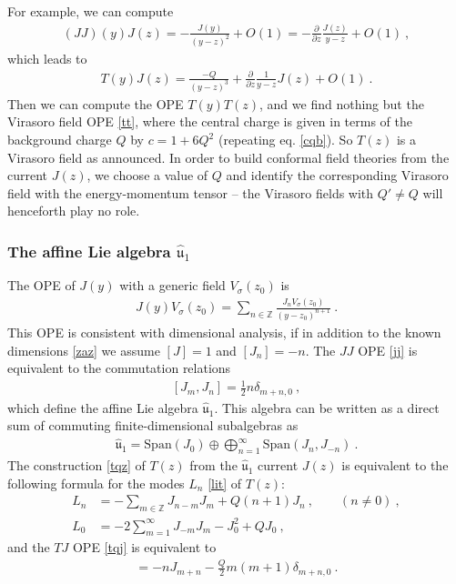 \documentclass[12pt, a4paper, notitlepage, twoside]{report}
\numberwithin{equation}{section}
\theoremstyle{break}
\begin{document}
For example, we can compute 
\begin{align}
 (JJ)(y)J(z) = -\frac{J(y)}{(y-z)^2} +O(1) =  -{\frac{\partial}{\partial z}}\frac{J(z)}{y-z} + O(1)\ ,
\end{align}
which leads to 
\begin{align}
 \boxed{T(y)J(z) = \frac{-Q}{(y-z)^3} +{\frac{\partial}{\partial z}}\frac{1}{y-z}J(z) + O(1)}\ .
\label{tqj}
\end{align}
Then we can compute the OPE $T(y)T(z)$, and we find nothing but the Virasoro field OPE \eqref{tt}, where the central charge is given in terms of the background charge $Q$ by $c = 1+6 Q^2$ (repeating eq. \eqref{cqb}). 
So $T(z)$ is a Virasoro field as announced. 
In order to build conformal field theories from the current $J(z)$, we choose a value of $Q$ and identify the corresponding Virasoro field with the energy-momentum tensor -- the Virasoro fields with $Q'\neq Q$ will henceforth play no role.

\subsubsection{The affine Lie algebra \boldmath $\hat{\mathfrak{u}}_1$}

The OPE of $J(y)$ with a generic field $V_\sigma(z_0)$ is 
\begin{align}
 \boxed{J(y) V_\sigma(z_0) = \sum_{n\in {\mathbb{Z}}} \frac{J_n V_\sigma(z_0)}{(y-z_0)^{n+1}}}\ .
\label{jvn}
\end{align}
This OPE is consistent with dimensional analysis, if in addition to the known dimensions \eqref{zaz} we assume $[J]=1$ and $[J_n]=-n$.
The $JJ$ OPE \eqref{jj} is equivalent to the commutation relations
\begin{align}
 \boxed{ [J_m,J_n] =  \frac12 n \delta_{m+n,0}}\ ,
\label{jmjn}
\end{align}
which define the affine Lie algebra \textbf{\boldmath $\hat{\mathfrak{u}}_1$}.
This algebra can be written as a direct sum of commuting finite-dimensional subalgebras as 
\begin{align}
 \hat{\mathfrak{u}}_1 = \text{Span}(J_0) \oplus \bigoplus_{n=1}^\infty \text{Span}(J_n,J_{-n}) \ .
\end{align}
The construction \eqref{tqz} of $T(z)$ from the $\hat{\mathfrak{u}}_1$ current $J(z)$ is equivalent to the following formula for the modes $L_n$ \eqref{lit} of $T(z)$:
\begin{align}
 L_n &= -\sum_{m\in{\mathbb{Z}}} J_{n-m}J_m + Q(n+1)J_n\ , \qquad (n\neq 0)\ ,
\label{lnj}
\\
L_0 &=-2\sum_{m=1}^\infty J_{-m}J_m -J_0^2+QJ_0 \ ,
\label{lzj}
\end{align}
and the $TJ$ OPE \eqref{tqj} is equivalent to 
\begin{align}
 [L_m,J_n] = -nJ_{m+n} -\frac{Q}{2}m(m+1) \delta_{m+n,0} \ . 
\end{align}
\end{document}
